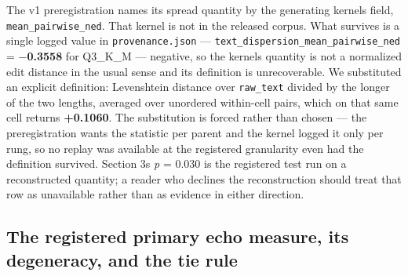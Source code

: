 The v1 preregistration names its spread quantity by the generating kernel\textquotesingle s field, \texttt{mean\_pairwise\_ned}. That kernel is not in the released corpus. What survives is a single logged value in \texttt{provenance.json} --- \texttt{text\_dispersion\_mean\_pairwise\_ned} = \textbf{\(-\)0.3558} for Q3\_K\_M --- negative, so the kernel\textquotesingle s quantity is not a normalized edit distance in the usual sense and its definition is unrecoverable. We substituted an explicit definition: Levenshtein distance over \texttt{raw\_text} divided by the longer of the two lengths, averaged over unordered within-cell pairs, which on that same cell returns \textbf{+0.1060}. The substitution is forced rather than chosen --- the preregistration wants the statistic per parent and the kernel logged it only per rung, so no replay was available at the registered granularity even had the definition survived. Section 3\textquotesingle s \emph{p} = 0.030 is the registered test run on a reconstructed quantity; a reader who declines the reconstruction should treat that row as unavailable rather than as evidence in either direction.

\hypertarget{the-registered-primary-echo-measure-its-degeneracy-and-the-tie-rule}{%
\subsection{The registered primary echo measure, its degeneracy, and the tie rule}\label{the-registered-primary-echo-measure-its-degeneracy-and-the-tie-rule}}

